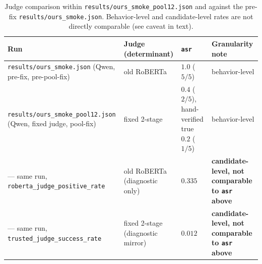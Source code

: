 \documentclass[11pt,letterpaper]{article}
\begin{document}
\begin{table}[htbp]
\centering
\caption{Judge comparison within \texttt{results/ours\_smoke\_pool12.json} and against the
  pre-fix \texttt{results/ours\_smoke.json}. Behavior-level and candidate-level rates are not
  directly comparable (see caveat in text).}
\label{tab:judge-comparison}
\begin{tabular}{p{4.2cm}p{2.3cm}p{2.0cm}p{4.5cm}}
\toprule
Run & Judge (determinant) & \texttt{asr} & Granularity note \\
\midrule
\texttt{results/ours\_smoke.json} (Qwen, pre-fix, pre-pool-fix) & old RoBERTa & $1.0$ ($5/5$) & behavior-level \\
\texttt{results/ours\_smoke\_pool12.json} (Qwen, fixed judge, pool-fix) & fixed 2-stage & $0.4$ ($2/5$), hand-verified true $0.2$ ($1/5$) & behavior-level \\
--- same run, \texttt{roberta\_judge\_positive\_rate} & old RoBERTa (diagnostic only) & $0.335$ & \textbf{candidate-level, not comparable to \texttt{asr} above} \\
--- same run, \texttt{trusted\_judge\_success\_rate} & fixed 2-stage (diagnostic mirror) & $0.012$ & \textbf{candidate-level, not comparable to \texttt{asr} above} \\
\bottomrule
\end{tabular}
\end{table}
\end{document}
